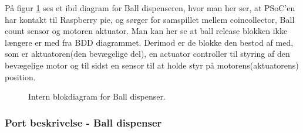 \documentclass[Arkitektur/System_main.tex]{subfiles}
\begin{document}
På figur \ref{fig:balldispensere_hardware_ibd} ses et ibd diagram for Ball dispenseren, hvor man her ser, at PSoC'en har kontakt til Raspberry pie, og sørger for samspillet mellem coincollector, Ball count sensor og motoren aktuator. Man kan her se at ball release blokken ikke længere er med fra BDD diagrammet. Derimod er de blokke den bestod af med, som er aktuatoren(den bevægelige del), en actuator controller til styring af den bevægelige motor og til sidst en sensor til at holde styr på motorens(aktuatorens) position.

\begin{figure}[H]
    \centering
    \caption{Intern blokdiagram for Ball dispenser.}
    \label{fig:balldispensere_hardware_ibd}
\end{figure}

\subsubsection{Port beskrivelse - Ball dispenser} \label{sec:balldispenser_hardware_ports}
\end{document}
